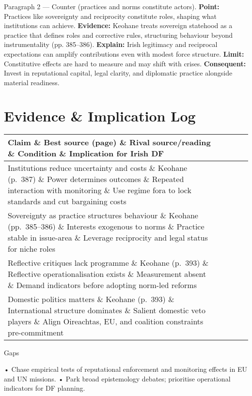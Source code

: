 Paragraph 2 — Counter (practices and norms constitute actors).
\textbf{Point:} Practices like sovereignty and reciprocity constitute roles, shaping what institutions can achieve. \textbf{Evidence:} Keohane treats sovereign statehood as a practice that defines roles and corrective rules, structuring behaviour beyond instrumentality (pp. 385–386). \textbf{Explain:} Irish legitimacy and reciprocal expectations can amplify contributions even with modest force structure. \textbf{Limit:} Constitutive effects are hard to measure and may shift with crises. \textbf{Consequent:} Invest in reputational capital, legal clarity, and diplomatic practice alongside material readiness.



\section*{Evidence \& Implication Log}
\begin{tabular}{p{3.2cm}p{4.2cm}p{3.6cm}p{3.2cm}p{4.2cm}}
		\textbf{Claim} \& \textbf{Best source (page)} \& \textbf{Rival source/reading} \& \textbf{Condition} \& \textbf{Implication for Irish DF}\\\hline
		Institutions reduce uncertainty and costs \& Keohane (p.~387) \& Power determines outcomes \& Repeated interaction with monitoring \& Use regime fora to lock standards and cut bargaining costs\\
		Sovereignty as practice structures behaviour \& Keohane (pp.~385--386) \& Interests exogenous to norms \& Practice stable in issue-area \& Leverage reciprocity and legal status for niche roles\\
		Reflective critiques lack programme \& Keohane (p.~393) \& Reflective operationalisation exists \& Measurement absent \& Demand indicators before adopting norm-led reforms\\
		Domestic politics matters \& Keohane (p.~393) \& International structure dominates \& Salient domestic veto players \& Align Oireachtas, EU, and coalition constraints pre-commitment\\
\end{tabular}

Gaps

• Chase empirical tests of reputational enforcement and monitoring effects in EU and UN missions.
• Park broad epistemology debates; prioritise operational indicators for DF planning.
	


\parencite{THORHALLSSON_2006
}

